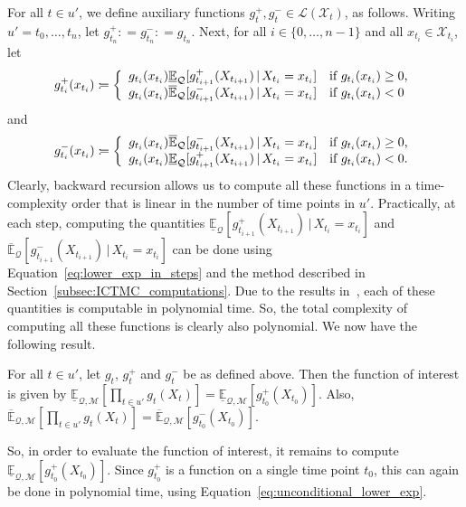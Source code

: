 \documentclass[twoside,11pt]{article}
\newcommand{\states}{\mathcal{X}}
\newcommand{\lexp}{\underline{\mathbb{E}}_{\rateset,\mathcal{M}}}
\newcommand{\uexp}{\overline{\mathbb{E}}_{\rateset,\mathcal{M}}}
\newcommand{\gambles}{\mathcal{L}}
\newcommand{\rateset}{\mathcal{Q}}
\newcommand{\coloneqq}{:\!=}
\begin{document}
For all $t\in u'$, we define auxiliary functions $g_{t}^+,g_{t}^-\in\gambles(\states_{t})$, as follows. Writing $u'=t_0,\ldots,t_{n}$, let $g_{t_{n}}^+\coloneqq g_{t_{n}}^-\coloneqq g_{t_{n}}$. Next,  for all $i\in\{0,\dots,n-1\}$ and all $x_{t_i}\in\states_{t_i}$, let
\begin{equation*}
g_{t_i}^+(x_{t_i}) \coloneqq \left\{\begin{array}{ll}
g_{t_i}(x_{t_i})\underline{\mathbb{E}}_\rateset[g_{t_{i+1}}^+(X_{t_{i+1}})\,\vert\, X_{t_i}=x_{t_i}] & \text{if $g_{t_i}(x_{t_i})\geq 0$,} \\
g_{t_i}(x_{t_i})\overline{\mathbb{E}}_\rateset[g_{t_{i+1}}^-(X_{t_{i+1}})\,\vert\, X_{t_i}=x_{t_i}] & \text{if $g_{t_i}(x_{t_i})<0$}
\end{array}\right.\vspace{-5pt}
\end{equation*}
and
\begin{equation*}
g_{t_i}^-(x_{t_i}) \coloneqq \left\{\begin{array}{ll}
g_{t_i}(x_{t_i})\overline{\mathbb{E}}_\rateset[g_{t_{i+1}}^-(X_{t_{i+1}})\,\vert\, X_{t_i}=x_{t_i}] & \text{if $g_{t_i}(x_{t_i})\geq 0$,} \\
g_{t_i}(x_{t_i})\underline{\mathbb{E}}_\rateset[g_{t_{i+1}}^+(X_{t_{i+1}})\,\vert\, X_{t_i}=x_{t_i}] & \text{if $g_{t_i}(x_{t_i})<0$.}
\end{array}\right.\vspace{5pt}
\end{equation*}
Clearly, backward recursion allows us to compute all these functions in a time-complexity order that is linear in the number of time points in $u'$. Practically, at each step, computing the quantities $\underline{\mathbb{E}}_\rateset[g_{t_{i+1}}^+(X_{t_{i+1}})\,\vert\, X_{t_i}=x_{t_i}]$ and $\overline{\mathbb{E}}_\rateset[g_{t_{i+1}}^-(X_{t_{i+1}})\,\vert\, X_{t_i}=x_{t_i}]$ can be done using Equation~\eqref{eq:lower_exp_in_steps} and the method described in Section~\ref{subsec:ICTMC_computations}. Due to the results in~\citep{krak2016ictmc}, each of these quantities is computable in polynomial time. So, the total complexity of computing all these functions is clearly also polynomial. We now have the following result.
\begin{proposition}\label{prop:computing_product_funcs}
For all $t\in u'$, let $g_{t}$, $g_{t}^+$ and $g_{t}^-$ be as defined above. Then the function of interest is given by
$\lexp\left[\prod_{t\in u'}g_{t}(X_{t})\right] = \lexp\left[g_{t_0}^+(X_{t_0})\right]$. Also,
$\uexp\left[\prod_{t\in u'}g_{t}(X_{t})\right]=\uexp\left[g_{t_0}^-(X_{t_0})\right]$.
\end{proposition}
So, in order to evaluate the function of interest, it remains to compute $\lexp\left[g_{t_0}^+(X_{t_0})\right]$. Since $g_{t_0}^+$ is a function on a single time point $t_0$, this can again be done in polynomial time, using Equation~\eqref{eq:unconditional_lower_exp}.
\end{document}
